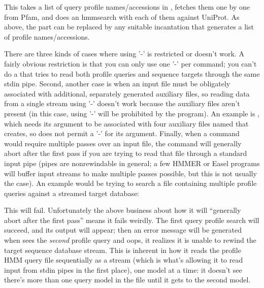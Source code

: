 
This takes a list of query profile names/accessions in
, fetches them one by one from Pfam, and does an
hmmsearch with each of them against UniProt. As above, the  part can be replaced by any suitable incantation
that generates a list of profile names/accessions.

There are three kinds of cases where using '-' is restricted or
doesn't work. A fairly obvious restriction is that you can only use
one '-' per command; you can't do a  that tries to
read both profile queries and sequence targets through the same stdin
pipe. Second, another case is when an input file must be obligately
associated with additional, separately generated auxiliary files, so
reading data from a single stream using '-' doesn't work because the
auxiliary files aren't present (in this case, using '-' will be
prohibited by the program). An example is , which needs
its  argument to be associated with four auxiliary
files named  that  creates,
so  does not permit a '-' for its 
argument. Finally, when a command would require multiple passes over
an input file, the command will generally abort after the first pass
if you are trying to read that file through a standard input pipe
(pipes are nonrewindable in general; a few HMMER or Easel programs
will buffer input streams to make multiple passes possible, but this
is not usually the case). An example would be trying to search a file
containing multiple profile queries against a streamed target
database:



This will fail. Unfortunately the above business about how it will
``generally abort after the first pass'' means it fails weirdly. The
first query profile search will succeed, and its output will appear;
then an error message will be generated when  sees the
\emph{second} profile query and oops, it realizes it is unable to
rewind the target sequence database stream. This is inherent in how it
reads the profile HMM query file sequentially as a stream (which is
what's allowing it to read input from stdin pipes in the first place),
one model at a time: it doesn't see there's more than one query model
in the file until it gets to the second model.

